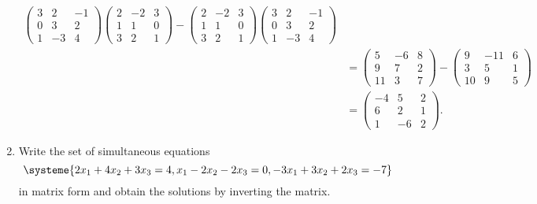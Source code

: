 \documentclass[11pt]{article}
\begin{document}
\begin{enumerate}
\begin{align*}
\begin{pmatrix}
            3 & 2 & -1 \\
            0 & 3 & 2 \\
            1 & -3 & 4
        \end{pmatrix}\begin{pmatrix}
            2 & -2 & 3 \\
            1 & 1 & 0 \\
            3 & 2 & 1
        \end{pmatrix} - \begin{pmatrix}
            2 & -2 & 3 \\
            1 & 1 & 0 \\
            3 & 2 & 1
        \end{pmatrix}\begin{pmatrix}
            3 & 2 & -1 \\
            0 & 3 & 2 \\
            1 & -3 & 4
        \end{pmatrix}\\
        &= \begin{pmatrix}
            5 & -6 & 8 \\
            9 & 7 & 2 \\
            11 & 3 & 7
        \end{pmatrix} - \begin{pmatrix}
            9 & -11 & 6 \\
            3 & 5 & 1 \\
            10 & 9 & 5
        \end{pmatrix}\\
        &= \begin{pmatrix}
            -4 & 5 & 2 \\
            6 & 2 & 1 \\
            1 & -6 & 2
        \end{pmatrix}.
    \end{align*}
    \item Write the set of simultaneous equations 
    \[\systeme{2x_1 + 4x_2 + 3x_3 = 4, x_1 - 2x_2 - 2x_3 = 0, -3x_1 + 3x_2 + 2x_3 = -7}\]
    in matrix form and obtain the solutions by inverting the matrix.


\end{enumerate}
\end{document}
